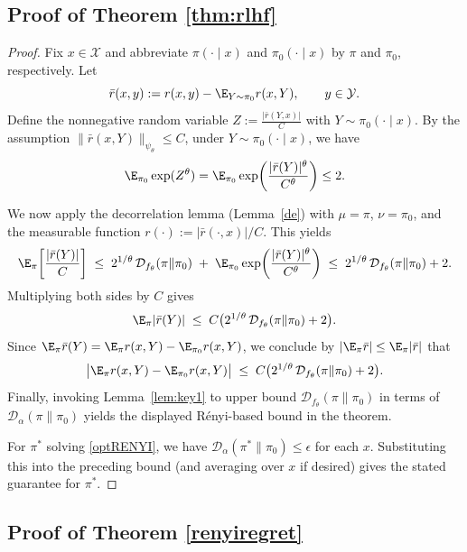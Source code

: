 \documentclass[11pt]{article}
\providecommand{\DD}{\mathcal{D}}
\begin{document}
\subsection{Proof of Theorem \ref{thm:rlhf}}
\begin{proof}
Fix $x\in\mathcal X$ and abbreviate $\pi(\cdot\mid x)$ and $\pi_0(\cdot\mid x)$
by $\pi$ and $\pi_0$, respectively. Let
\[
\bar r(x,y):= r(x,y)-\E_{Y\sim\pi_0}r(x,Y),
\qquad y\in\mathcal Y.
\]
Define the nonnegative random variable
$Z:=\frac{|\bar r(Y,x)|}{C}$ with $Y\sim\pi_0(\cdot\mid x)$. By the assumption $\|\bar r(x,Y)\|_{\psi_\theta}\le C$, under $Y\sim\pi_0(\cdot\mid x)$, we have
\[
\E_{\pi_0}\exp(Z^\theta)
=
\E_{\pi_0}\exp\!\left(\frac{|\bar r(Y)|^\theta}{C^\theta}\right)
\le 2.
\]

We now apply the decorrelation lemma (Lemma~\ref{de}) with $\mu=\pi$, $\nu=\pi_0$, and
the measurable function $r(\cdot):=|\bar r(\cdot,x)|/C$. This yields
\[
\E_{\pi}\!\left[\frac{|\bar r(Y)|}{C}\right]
\;\le\;
2^{1/\theta}\,\DD_{f_\theta}(\pi\|\pi_0)
\;+\;
\E_{\pi_0}\exp\!\left(\frac{|\bar r(Y)|^\theta}{C^\theta}\right)
\;\le\;
2^{1/\theta}\,\DD_{f_\theta}(\pi\|\pi_0)+2.
\]
Multiplying both sides by $C$ gives
\[
\E_{\pi}|\bar r(Y)|
\;\le\;
C\bigl(2^{1/\theta}\,\DD_{f_\theta}(\pi\|\pi_0)+2\bigr).
\]
Since $\E_\pi \bar r(Y)=\E_\pi r(x,Y)-\E_{\pi_0}r(x,Y)$, we conclude by
$|\E_\pi \bar r|\le \E_\pi|\bar r|$ that
\[
\bigl|\E_\pi r(x,Y)-\E_{\pi_0}r(x,Y)\bigr|
\;\le\;
C\bigl(2^{1/\theta}\,\DD_{f_\theta}(\pi\|\pi_0)+2\bigr).
\]
Finally, invoking Lemma~\ref{lem:key1} to upper bound
$\DD_{f_\theta}(\pi\|\pi_0)$ in terms of $\DD_\alpha(\pi\|\pi_0)$ yields the
displayed R\'enyi-based bound in the theorem.

For $\pi^*$ solving \eqref{optRENYI}, we have
$\DD_\alpha(\pi^*\|\pi_0)\le\epsilon$ for each $x$. Substituting this into the
preceding bound (and averaging over $x$ if desired) gives the stated guarantee
for $\pi^*$.
\end{proof}

\subsection{Proof of Theorem \ref{renyiregret}}
\end{document}
